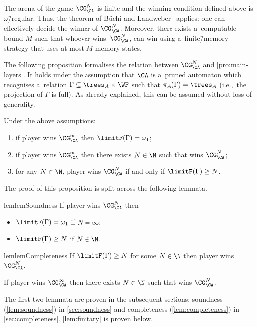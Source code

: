 \begin{rem}
\label{rem:decide-winner}
	The arena of the game $\CG^N_\CA$ is finite and the winning condition defined above is $\omega$\=/regular.
	Thus, the theorem of Büchi and Landweber~\cite{buchi_synthesis} applies: one can effectively decide the winner of $\CG^N_\CA$.
	Moreover, there exists a~computable bound $M$ such that whoever wins~$\CG^N_\CA$, can win using a~finite\=/memory strategy that uses at most $M$ memory states.
\end{rem}

The following proposition formalises the relation between $\CG^N_\CA$ and \cref{pro:main-layers}.
It holds under the assumption that $\CA$ is a~pruned automaton which recognises a~relation $\Gamma\subseteq\trees_A\times\WF$ such that $\pi_A(\Gamma)=\trees_A$ (i.e.,~the projection of $\Gamma$ is full).
As already explained, this can be assumed without loss of generality.

\begin{prop}
	Under the above assumptions:
	\begin{enumerate}
	\item if player \eve wins $\CG^\infty_\CA$ then $\limitF(\Gamma)=\omega_1$;
	\item if player \adam wins $\CG^\infty_\CA$ then there exists $N\in\N$ such that \adam wins $\CG^N_\CA$;
	\item for any $N\in\N$, player \eve wins $\CG^N_\CA$ if and only if $\limitF(\Gamma)\geq N$.
	\end{enumerate}
\end{prop}
\noindent %
The proof of this proposition is split across the following lemmata.

\begin{restatable}{lem}{lemSoundness}
\label{lem:soundness}
	If player \eve wins $\CG^N_\CA$ then
	\begin{itemize}
		\item $\limitF(\Gamma)=\omega_1$ if $N=\infty$;
		\item $\limitF(\Gamma)\geq N$ if $N\in\N$.
	\end{itemize}
\end{restatable}

\begin{restatable}{lem}{lemCompleteness}
\label{lem:completeness}
	If $\limitF(\Gamma)\geq N$ for some $N\in\N$ then player \eve wins $\CG^N_\CA$.
\end{restatable}

\begin{lem}\label{lem:finitary}
	If player \adam wins $\CG^\infty_\CA$ then there exists $N\in\N$ such that \adam wins $\CG^N_\CA$.
\end{lem}
\noindent %
The first two lemmata are proven in the subsequent sections: soundness (\cref{lem:soundness}) in \cref{sec:soundness}
and completeness (\cref{lem:completeness}) in \cref{sec:completeness}. \cref{lem:finitary} is proven below.

